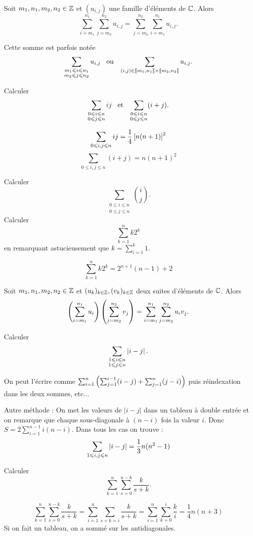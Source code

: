 \documentclass{magnoliaold}
\begin{document}
\begin{proposition}
Soit $m_1,n_1,m_2,n_2\in\mathbb{Z}$ et $(u_{i,j})$ une famille d'éléments de $\mathbb{C}$. Alors
\[\sum_{i=m_1}^{n_1} \sum_{j=m_2}^{n_2} u_{i, j} =
\sum_{j=m_2}^{n_2} \sum_{i=m_1}^{n_1} u_{i, j}.\]
\end{proposition}

\begin{remarqueUnique}
\remarque Cette somme est parfois notée
\[\sum_{\substack{m_1 \leqslant i \leqslant n_1 \\ m_2 \leqslant j \leqslant n_2}} u_{i, j} \quad\!\text{ou}\quad\! 
  \sum_{(i,j) \in \left\llbracket m_1,n_1\right\rrbracket \times \left\llbracket m_2,n_2\right\rrbracket} u_{i, j}.\]
\end{remarqueUnique}

\begin{exos}
\exo Calculer
  \[\sum_{\substack{0 \leqslant i \leqslant n\\0 \leqslant j \leqslant n}} ij \quad\!\text{et}\quad\!
    \sum_{\substack{0 \leqslant i \leqslant n\\0 \leqslant j \leqslant n}} (i+j).\]
  \begin{sol}
\[\sum_{0 \leqslant i,j \leqslant n} ij=\frac{1}{4}\left[n(n+1)\right]^2\]
\[\sum_{0 \leq i,j \leq n} (i+j)=n(n+1)^2\]
  \end{sol}
\exo Calculer
  \[\sum_{\substack{0 \leq i \leq n\\0 \leq j \leq n}} \binom{i}{j}.\]
\exo Calculer
  \[\sum_{k=1}^n k 2^k\]
  en remarquant astucieusement que $k=\sum_{i=1}^k 1$.
  \begin{sol}
  \[\sum_{k=1}^n k 2^k=2^{n+1}(n-1)+2\]
  \end{sol}
\end{exos}

\begin{proposition}
Soit $m_1,n_1,m_2,n_2\in\mathbb{Z}$ et $(u_k)_{k\in\mathbb{Z}}, (v_k)_{k\in\mathbb{Z}}$ deux suites d'éléments de $\mathbb{C}$. Alors
\[\left(\sum_{i=m_1}^{n_1} u_i\right)\left(\sum_{j=m_2}^{n_2} v_j\right)=\sum_{i=m_1}^{n_1} \sum_{j=m_2}^{n_2} u_i v_j.\]
\end{proposition}


\begin{exos}
\exo Calculer
  \[\sum_{\substack{1 \leqslant i \leqslant n\\1 \leqslant j \leqslant n}}\left|i-j\right|.\]
  \begin{sol}
  On peut l'écrire comme $\sum_{i=1}^n\left(\sum_{j=1}^{i-1}(i-j)+\sum_{j=1}^n(j-i)\right)$ puis réindexation dans les deux sommes, etc...
  
  Autre méthode : On met les valeurs de $|i-j|$ dans un tableau à double entrée et on remarque que chaque sous-diagonale à $(n-i)$ fois la valeur $i$. Donc $S=2\sum_{i=1}^{n-1}i(n-i)$. Dans tous les cas on trouve :
\[\sum_{1\leqslant i, j \leqslant n}\left|i-j\right|=\frac{1}{3}n(n^2-1)\]
  \end{sol}
\exo Calculer
  \[\sum_{k = 1}^n \sum_{s = 0}^{n-k} \dfrac{k}{s + k}.\]
  \begin{sol}
  
  
\[\sum_{k=1}^n \sum_{s=0}^{n-k} \frac{k}{s+k}=\sum_{i=1}^n\sum_{s+k=i}\frac{k}{s+k}=\sum_{i=1}^n\sum_{k=0}^{i}\frac{k}{i}=\frac{1}{4}n(n+3)\]
Si on fait un tableau, on a sommé sur les antidiagonales.
  \end{sol}
\end{exos}
\end{document}
